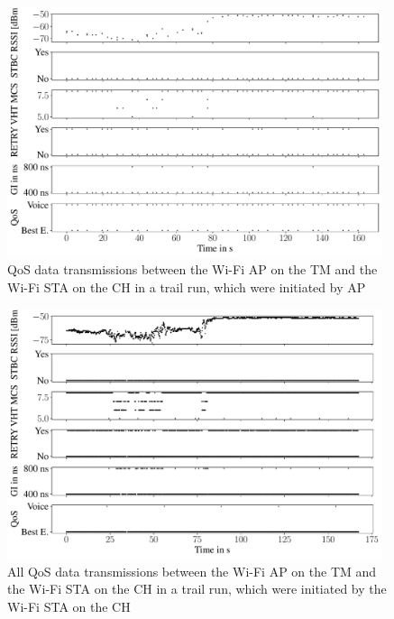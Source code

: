 \begin{figure}[H]%
	\centering
	\includegraphics[width=0.98\textwidth]{figures/wireless5_ap}
	\caption{QoS data transmissions between the Wi-Fi \acf{AP} on the \acf{TM} and the Wi-Fi \ac{STA} on the \acf{CH} in a trail run,
	which were initiated by \ac{AP}}
	\label{fig:trailrunAP}%
\end{figure}

\begin{figure}[H]%
	\centering
	\includegraphics[width=0.98\textwidth]{figures/wireless5_lan}
	\caption{All QoS data transmissions between the Wi-Fi \acf{AP} on the \acf{TM} and the Wi-Fi \ac{STA} on the \acf{CH} in a trail run,
	which were initiated by the Wi-Fi \ac{STA} on the \ac{CH}}
	\label{fig:trailrunNode}%
\end{figure}


